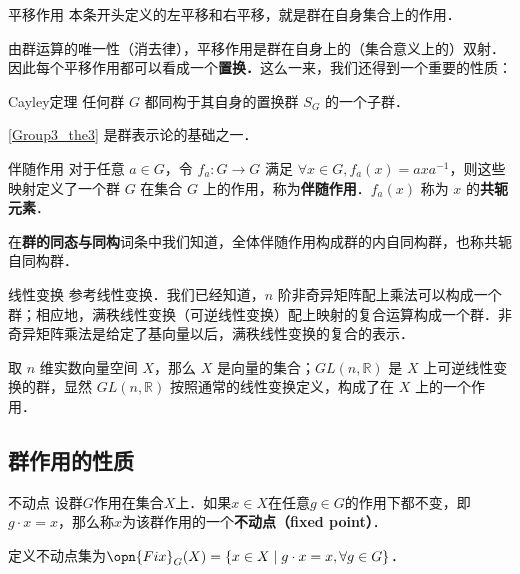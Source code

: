 \begin{example}{平移作用}\label{Group3_ex1}
本条开头定义的左平移和右平移，就是群在自身集合上的作用．
\end{example}

由群运算的唯一性（消去律），平移作用是群在自身上的（集合意义上的）双射．因此每个平移作用都可以看成一个\textbf{置换．}这么一来，我们还得到一个重要的性质：

\begin{theorem}{Cayley定理}\label{Group3_the3}
任何群 $G$ 都同构于其自身的置换群 $S_G$ 的一个子群．
\end{theorem}

\autoref{Group3_the3} 是群表示论的基础之一．

\begin{example}{伴随作用}\label{Group3_ex2}
对于任意 $a\in G$，令 $f_a: G\rightarrow G$ 满足 $\forall x\in G, f_a(x)=axa^{-1}$，则这些映射定义了一个群 $G$ 在集合 $G$ 上的作用，称为\textbf{伴随作用}．$f_a(x)$ 称为 $x$ 的\textbf{共轭元素}．

在\textbf{群的同态与同构}词条中我们知道，全体伴随作用构成群的内自同构群，也称共轭自同构群．
\end{example}

\begin{example}{线性变换}\label{Group3_ex3}
参考线性变换．我们已经知道，$n$ 阶非奇异矩阵配上乘法可以构成一个群；相应地，满秩线性变换（可逆线性变换）配上映射的复合运算构成一个群．非奇异矩阵乘法是给定了基向量以后，满秩线性变换的复合的表示．

取 $n$ 维实数向量空间 $X$，那么 $X$ 是向量的集合；$GL(n,\mathbb{R})$ 是 $X$ 上可逆线性变换的群，显然 $GL(n,\mathbb{R})$ 按照通常的线性变换定义，构成了在 $X$ 上的一个作用．
\end{example}

\subsection{群作用的性质}


\begin{definition}{不动点}
设群$G$作用在集合$X$上．如果$x\in X$在任意$g\in G$的作用下都不变，即$g\cdot x=x$，那么称$x$为该群作用的一个\textbf{不动点（fixed point）}．

定义不动点集为$\opn{Fix}_G(X)=\{x\in X\mid g\cdot x=x, \forall g\in G\}$．
\end{definition}




